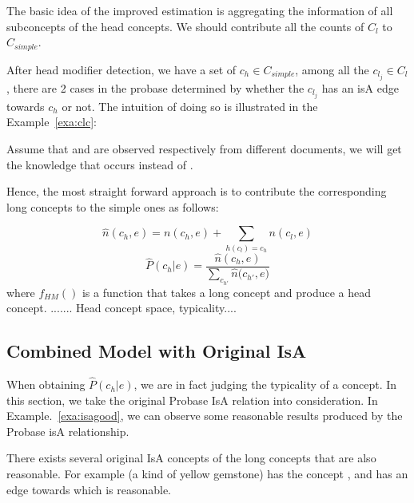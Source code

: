 The basic idea of the improved estimation is aggregating the information of all subconcepts of the head concepts.  We should contribute all the counts of $C_{l}$ to $C_{simple}$.


After head modifier detection, we have a set of ${c_h} \in C_{simple}$, among all the $c_{l_j}\in C_{l}$, there are 2 cases in the probase determined by whether the $c_{l_j}$ has an isA edge towards ${c_h}$ or not.
The intuition of doing so is illustrated in the Example~\ref{exa:clc}:

\begin{example}
\label{exa:clc}
Assume that   and  are observed respectively  from different documents, we will get the knowledge that  occurs  instead of .
\end{example}

Hence, the most straight forward approach is to contribute the corresponding long concepts to the simple ones as follows:

$$\hat{n}(c_h, e)={n}(c_h, e)+\sum_{ h(c_l)=c_h} n(c_l,e)$$
$$\hat{P}(c_h|e)=\frac{\hat{n}(c_h, e)}{\sum_{c_{h'}}{\hat{n}(c_{h'}}, e)}$$
where $f_{HM}()$ is a function that takes a long concept and produce a head concept.
....... Head concept space, typicality....


\subsection{Combined Model with Original IsA}
When obtaining $\hat{P}(c_h|e)$, we are in fact judging the typicality of a concept.
In this section, we take the original Probase IsA relation into consideration. In Example.~\ref{exa:isagood}, we can observe some reasonable results produced by the Probase isA relationship.

\begin{example}
\label{exa:isagood}
  There exists several original IsA concepts of the long concepts that are also reasonable. For example (a kind of yellow gemstone) has the concept , and  has an edge towards  which is reasonable.
\end{example}


